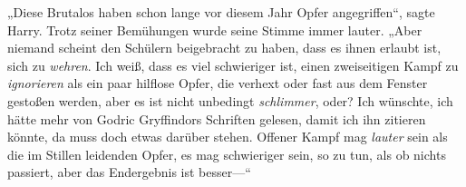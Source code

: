 „Diese Brutalos haben schon lange vor diesem Jahr Opfer angegriffen“, sagte Harry. Trotz seiner Bemühungen wurde seine Stimme immer lauter. „Aber niemand scheint den Schülern beigebracht zu haben, dass es ihnen erlaubt ist, sich zu \emph{wehren}. Ich weiß, dass es viel schwieriger ist, einen zweiseitigen Kampf zu \emph{ignorieren} als ein paar hilflose Opfer, die verhext oder fast aus dem Fenster gestoßen werden, aber es ist nicht unbedingt \emph{schlimmer}, oder? Ich wünschte, ich hätte mehr von Godric Gryffindors Schriften gelesen, damit ich ihn zitieren könnte, da muss doch etwas darüber stehen. Offener Kampf mag \emph{lauter} sein als die im Stillen leidenden Opfer, es mag schwieriger sein, so zu tun, als ob nichts passiert, aber das Endergebnis ist besser—“

